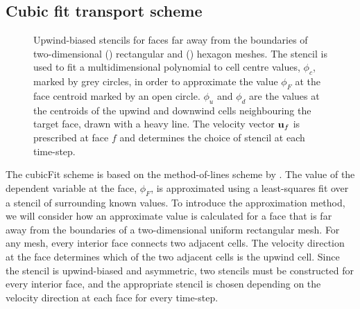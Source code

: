 \subsection{Cubic fit transport scheme}

\begin{figure}
	\centering
	\begin{subfigure}{\textwidth}
		\centering
		
		\label{fig:cubicFit:interiorStencils:quad}
		\label{fig:cubicFit:interiorStencils:hex}
	\end{subfigure}
	\caption{Upwind-biased stencils for faces far away from the boundaries of two-dimensional
	() rectangular and
	() hexagon meshes.
	The stencil is used to fit a multidimensional polynomial to cell centre values, $\phi_c$, marked by grey circles, in order to approximate the value $\phi_F$ at the face centroid marked by an open circle.  $\phi_u$ and $\phi_d$ are the values at the centroids of the upwind and downwind cells neighbouring the target face, drawn with a heavy line.  The velocity vector $\mathbf{u}_f$ is prescribed at face $f$ and determines the choice of stencil at each time-step.}
	\label{fig:cubicFit:interiorStencils}
\end{figure}

The cubicFit scheme is based on the method-of-lines scheme by \citet{weller-shahrokhi2014}. The value of the dependent variable at the face, $\phi_F$, is approximated using a least-squares fit over a stencil of surrounding known values.
To introduce the approximation method, we will consider how an approximate value is calculated for a face that is far away from the boundaries of a two-dimensional uniform rectangular mesh.
For any mesh, every interior face connects two adjacent cells.  The velocity direction at the face determines which of the two adjacent cells is the upwind cell.  Since the stencil is upwind-biased and asymmetric, two stencils must be constructed for every interior face, and the appropriate stencil is chosen depending on the velocity direction at each face for every time-step.


